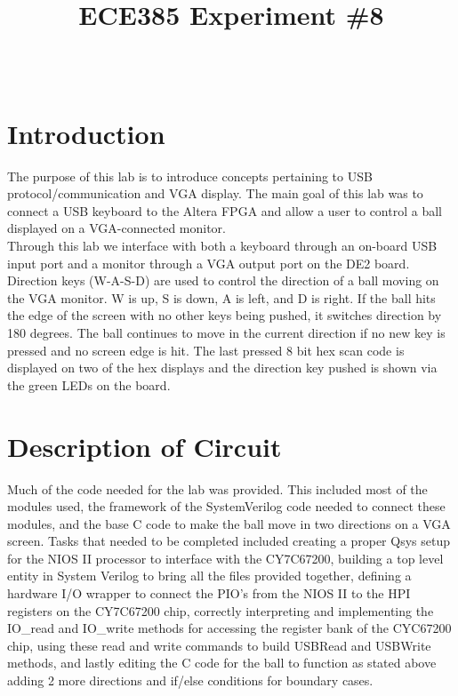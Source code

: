 \documentclass[journal, twocolumn, final,11pt,letterpaper]{IEEEtran}
\title{ECE385 Experiment \#8
	}
\author{
\IEEEauthorblockN{Eric Meyers, Ryan Helsdingen}\\
\IEEEauthorblockA{Section ABG; TAs: Ben Delay, Shuo Liu \\
March 30th, 2016 \\
emeyer7, helsdin2}}
\begin{document}
	
\maketitle
\singlespacing

\section{Introduction}
The purpose of this lab is to introduce concepts pertaining to USB protocol/communication and VGA display. The main goal of this lab was to connect a USB keyboard to the Altera FPGA and allow a user to control a ball displayed on a VGA-connected monitor. \\

Through this lab we interface with both a keyboard through an on-board USB input port and a monitor through a VGA output port on the DE2 board.  Direction keys (W-A-S-D) are used to control the direction of a ball moving on the VGA monitor.  W is up, S is down, A is left, and D is right.  If the ball hits the edge of the screen with no other keys being pushed, it switches direction by 180 degrees.  The ball continues to move in the current direction if no new key is pressed and no screen edge is hit.  The last pressed 8 bit hex scan code is displayed on two of the hex displays and the direction key pushed is shown via the green LEDs on the board. \\

\section{Description of Circuit}
Much of the code needed for the lab was provided.  This included most of the modules used, the framework of the SystemVerilog code needed to connect these modules, and the base C code to make the ball move in two directions on a VGA screen.  Tasks that needed to be completed included creating a proper Qsys setup for the NIOS II processor to interface with the CY7C67200, building a top level entity in System Verilog to bring all the files provided together, defining a hardware I/O wrapper to connect the PIO's from the NIOS II to the HPI registers on the CY7C67200 chip, correctly interpreting and implementing the IO\_read and IO\_write methods for accessing the register bank of the CYC67200 chip, using these read and write commands to build USBRead and USBWrite methods, and lastly editing the C code for the ball to function as stated above adding 2 more directions and if/else conditions for boundary cases.  \\
\end{document}
